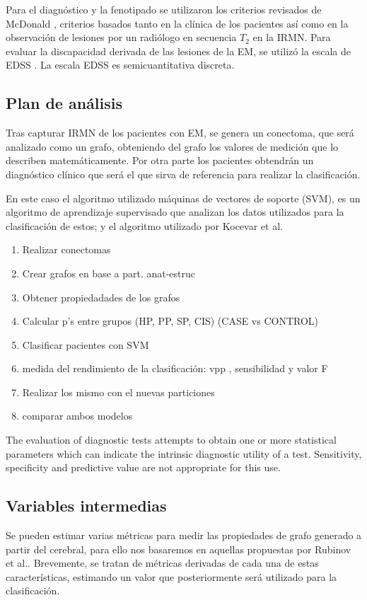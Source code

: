 \documentclass[fleqn,12pt]{UICArticle} %
\begin{document}
Para el diagnóstico y la fenotipado se utilizaron los criterios revisados de McDonald \cite{Mcdonald2001, Polman2011}, criterios basados tanto en la clínica de los pacientes así como en la observación de lesiones por un radiólogo en secuencia $T_2$ en la IRMN. Para evaluar la discapacidad derivada de las lesiones de la EM, se utilizó la escala de EDSS \cite{Kurtzke1983}. La escala EDSS es semicuantitativa discreta.


\subsection{Plan de análisis}

Tras capturar IRMN de los pacientes con EM, se genera un conectoma, que será analizado como un grafo, obteniendo del grafo los valores de medición que lo describen matemáticamente. Por otra parte los pacientes obtendrán un diagnóstico clínico que será el que sirva de referencia para realizar la clasificación.

En este caso el algoritmo utilizado máquinas de vectores de soporte (SVM), es un algoritmo de aprendizaje supervisado que analizan los datos utilizados para la clasificación de estos; y el algoritmo utilizado por Kocevar et al.\cite{Kocevar2016}


\begin{enumerate}[noitemsep]
\item Realizar conectomas
\item Crear grafos en base a part. anat-estruc
\item Obtener propiedadades de los grafos
\item Calcular p's entre grupos (HP, PP, SP, CIS) (CASE vs CONTROL) %
\item Clasificar pacientes con SVM
\item medida del rendimiento de la clasificación: vpp , sensibilidad y valor F
\item Realizar los mismo con el nuevas particiones
\item comparar ambos modelos
\end{enumerate}


The evaluation of diagnostic tests attempts to obtain one or more statistical parameters which can indicate the intrinsic diagnostic utility of a test. Sensitivity, specificity and predictive value are not appropriate for this use\cite{Birkett1988}.


\subsection{Variables intermedias}
Se pueden estimar varias métricas para medir las propiedades de grafo generado a partir del cerebral, para ello nos basaremos en aquellas propuestas por Rubinov et al.\cite{Rubinov2010}. Brevemente, se tratan de métricas derivadas de cada una de estas características, estimando un valor que posteriormente será utilizado para la clasificación.
\end{document}
